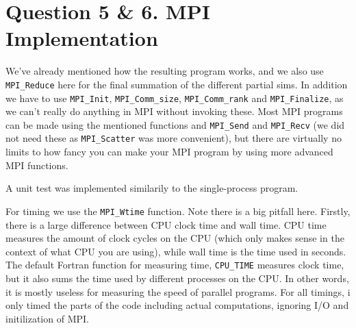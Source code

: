\documentclass[12pt]{article}
\begin{document}
\section{Question 5 \& 6. MPI Implementation}
We've already mentioned how the resulting program works, and we also use \texttt{MPI\_Reduce} here for the final summation of the different
partial sims. In addition we have to use \texttt{MPI\_Init}, 
\texttt{MPI\_Comm\_size}, \texttt{MPI\_Comm\_rank} and \texttt{MPI\_Finalize}, as we can't really do anything in MPI without invoking these. 
Most MPI programs can be made using the mentioned functions and \texttt{MPI\_Send} and \texttt{MPI\_Recv} (we did not need these as \texttt{MPI\_Scatter} was more convenient),
but there are virtually no limits to how fancy you can make your MPI program
by using more advanced MPI functions.

A unit test was implemented similarily to the single-process program.

For timing we use the \texttt{MPI\_Wtime} function. Note there is a big pitfall here. Firstly, there is a large difference between CPU clock time
and wall time. CPU time measures the amount of clock cycles on the CPU (which only makes sense in the context of what CPU you are using),
while wall time is the time used in seconds. The default Fortran function for measuring time, \texttt{CPU\_TIME} measures clock time, but it also sums the time used by different
processes on the CPU. In other words, it is mostly useless for measuring the speed of parallel programs. For all timings, i only timed the parts of the code including actual computations,
ignoring I/O and initilization of MPI. 
\end{document}
